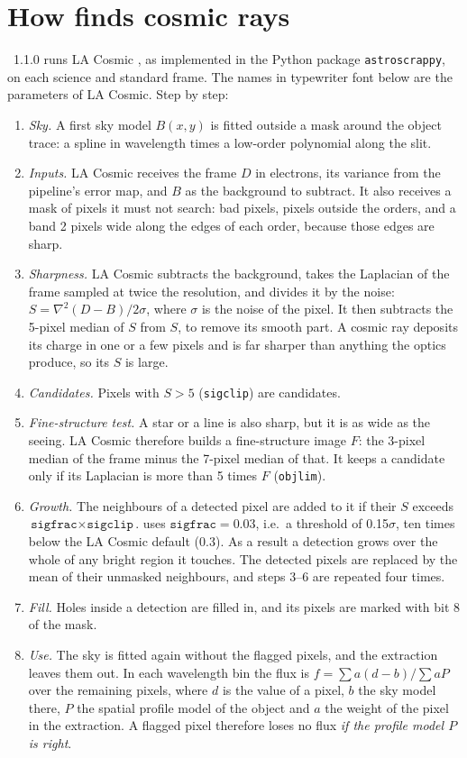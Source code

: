 \section{How \banzai{} finds cosmic rays}
\label{sec:cr_method}
\banzai{}~1.1.0 runs LA Cosmic \citep{vanDokkum2001}, as implemented in the Python package \texttt{astroscrappy}, on
each science and standard frame. The names in typewriter font below are the parameters of LA Cosmic. Step by step:
\begin{enumerate}
\item \textit{Sky.} A first sky model $B(x,y)$ is fitted outside a mask around the object trace: a spline in wavelength
times a low-order polynomial along the slit.
\item \textit{Inputs.} LA Cosmic receives the frame $D$ in electrons, its variance from the pipeline's error map, and
$B$ as the background to subtract. It also receives a mask of pixels it must not search: bad pixels, pixels outside the
orders, and a band 2 pixels wide along the edges of each order, because those edges are sharp.
\item \textit{Sharpness.} LA Cosmic subtracts the background, takes the Laplacian of the frame sampled at twice the
resolution, and divides it by the noise: $S=\nabla^2(D-B)/2\sigma$, where $\sigma$ is the noise of the pixel. It then
subtracts the 5-pixel median of $S$ from $S$, to remove its smooth part. A cosmic ray deposits its charge in one or a
few pixels and is far sharper than anything the optics produce, so its $S$ is large.
\item \textit{Candidates.} Pixels with $S>5$ (\texttt{sigclip}) are candidates.
\item \textit{Fine-structure test.} A star or a line is also sharp, but it is as wide as the seeing. LA Cosmic
therefore builds a fine-structure image $F$: the 3-pixel median of the frame minus the 7-pixel median of that. It keeps
a candidate only if its Laplacian is more than 5 times $F$ (\texttt{objlim}).
\item \textit{Growth.} The neighbours of a detected pixel are added to it if their $S$ exceeds
$\texttt{sigfrac}\times\texttt{sigclip}$. \banzai{} uses $\texttt{sigfrac}=0.03$, i.e.\ a threshold of 0.15$\sigma$,
ten times below the LA Cosmic default (0.3). As a result a detection grows over the whole of any bright region it
touches. The detected pixels are replaced by the mean of their unmasked neighbours, and steps 3--6 are repeated four
times.
\item \textit{Fill.} Holes inside a detection are filled in, and its pixels are marked with bit 8 of the mask.
\item \textit{Use.} The sky is fitted again without the flagged pixels, and the extraction leaves them out. In each
wavelength bin the flux is $f=\sum a(d-b)/\sum aP$ over the remaining pixels, where $d$ is the value of a pixel, $b$
the sky model there, $P$ the spatial profile model of the object and $a$ the weight of the pixel in the extraction.
A flagged pixel therefore loses no flux \textit{if the profile model $P$ is right}.
\end{enumerate}

